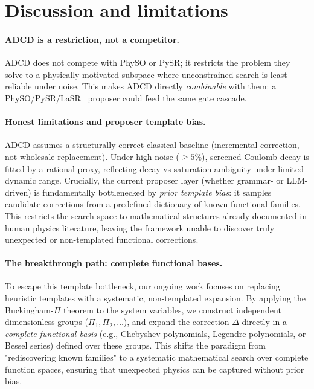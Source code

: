 \documentclass{article}
\begin{document}
\section{Discussion and limitations}
\label{sec:disc}

\paragraph{ADCD is a restriction, not a competitor.}
ADCD does not compete with PhySO or PySR; it restricts the problem they solve to a physically-motivated subspace where unconstrained search is least reliable under noise. This makes ADCD directly \emph{combinable} with them: a PhySO/PySR/LaSR~\cite{grayeli2024lasr} proposer could feed the same gate cascade.

\paragraph{Honest limitations and proposer template bias.}
ADCD assumes a structurally-correct classical baseline (incremental correction, not wholesale replacement). Under high noise ($\ge 5\%$), screened-Coulomb decay is fitted by a rational proxy, reflecting decay-vs-saturation ambiguity under limited dynamic range. 
Crucially, the current proposer layer (whether grammar- or LLM-driven) is fundamentally bottlenecked by \emph{prior template bias}: it samples candidate corrections from a predefined dictionary of known functional families. This restricts the search space to mathematical structures already documented in human physics literature, leaving the framework unable to discover truly unexpected or non-templated functional corrections.

\paragraph{The breakthrough path: complete functional bases.}
To escape this template bottleneck, our ongoing work focuses on replacing heuristic templates with a systematic, non-templated expansion. By applying the Buckingham-$\Pi$ theorem to the system variables, we construct independent dimensionless groups ($\Pi_1, \Pi_2, \dots$), and expand the correction $\Delta$ directly in a \emph{complete functional basis} (e.g., Chebyshev polynomials, Legendre polynomials, or Bessel series) defined over these groups. This shifts the paradigm from "rediscovering known families" to a systematic mathematical search over complete function spaces, ensuring that unexpected physics can be captured without prior bias.
\end{document}
